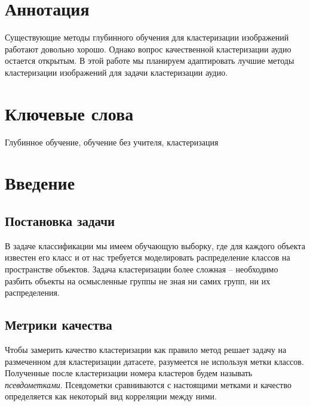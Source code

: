 \documentclass[a4paper,12pt]{extarticle}
\begin{document}
\newpage
\setcounter{page}{2}

{
	\hypersetup{linkcolor=black}
	\tableofcontents
}

\newpage

\newpage
\section*{Аннотация}   %
    Существующие методы глубинного обучения для кластеризации 
    изображений работают довольно хорошо. Однако вопрос качественной
    кластеризации аудио остается открытым. В этой работе мы планируем
    адаптировать лучшие методы кластеризации изображений для 
    задачи кластеризации аудио.


\section*{Ключевые слова}
Глубинное обучение, обучение без учителя, кластеризация
\pagebreak

\section{Введение}

\subsection{Постановка задачи}

В задаче классификации мы имеем обучающую выборку, где для каждого объекта
известен его класс и от нас требуется моделировать распределение
классов на пространстве объектов. Задача кластеризации более сложная
-- необходимо разбить объекты на осмысленные группы не зная ни 
самих групп, ни их распределения.

\subsection{Метрики качества}

Чтобы замерить качество кластеризации как правило метод
решает задачу на размеченном для кластеризации датасете, 
разумеется не используя метки классов. Полученные после 
кластеризации номера кластеров будем называть \textit{псевдометками}.
Псевдометки сравниваются с настоящими метками
и качество определяется как некоторый вид корреляции между ними.
\end{document}

